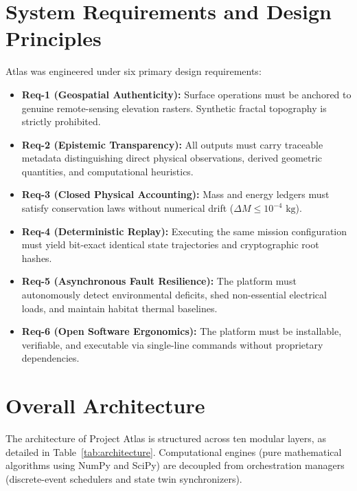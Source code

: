 \documentclass[10pt,journal,compsoc,twocolumn]{article}
\begin{document}
\section{System Requirements and Design Principles}
Atlas was engineered under six primary design requirements:
\begin{itemize}
    \item \textbf{Req-1 (Geospatial Authenticity):} Surface operations must be anchored to genuine remote-sensing elevation rasters. Synthetic fractal topography is strictly prohibited.
    \item \textbf{Req-2 (Epistemic Transparency):} All outputs must carry traceable metadata distinguishing direct physical observations, derived geometric quantities, and computational heuristics.
    \item \textbf{Req-3 (Closed Physical Accounting):} Mass and energy ledgers must satisfy conservation laws without numerical drift ($\Delta M \le 10^{-4}\text{ kg}$).
    \item \textbf{Req-4 (Deterministic Replay):} Executing the same mission configuration must yield bit-exact identical state trajectories and cryptographic root hashes.
    \item \textbf{Req-5 (Asynchronous Fault Resilience):} The platform must autonomously detect environmental deficits, shed non-essential electrical loads, and maintain habitat thermal baselines.
    \item \textbf{Req-6 (Open Software Ergonomics):} The platform must be installable, verifiable, and executable via single-line commands without proprietary dependencies.
\end{itemize}

\section{Overall Architecture}
The architecture of Project Atlas is structured across ten modular layers, as detailed in Table~\ref{tab:architecture}. Computational engines (pure mathematical algorithms using NumPy and SciPy) are decoupled from orchestration managers (discrete-event schedulers and state twin synchronizers).
\end{document}
